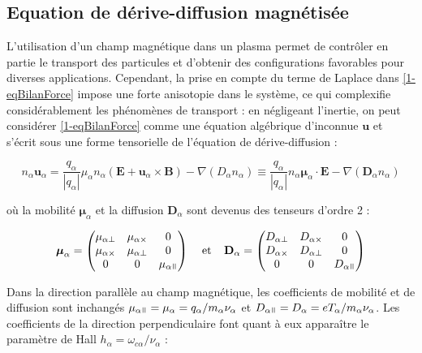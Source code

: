 \begin{refsection}
\subsection{Equation de dérive-diffusion magnétisée}
L'utilisation d'un champ magnétique dans un plasma permet de contrôler en partie
le transport des particules et d'obtenir des configurations favorables pour
diverses applications. Cependant, la prise en compte du terme de Laplace dans
\eqref{1-eqBilanForce} impose une forte anisotopie dans le système, ce qui
complexifie considérablement les phénomènes de transport : en
négligeant l'inertie, on peut considérer \eqref{1-eqBilanForce} comme une
équation algébrique d'inconnue $\mathbf u$ et s'écrit sous une forme
tensorielle de l'équation de dérive-diffusion :

\begin{equation}
\label{1-eqDriftDif}
n_\alpha\mathbf u_\alpha=\frac{q_\alpha}{|q_\alpha|}\mu_\alpha
n_\alpha\left(\mathbf E+\mathbf u_\alpha\times\mathbf
B\right)-\nabla\left(D_\alpha n_\alpha\right)\equiv
\frac{q_\alpha}{|q_\alpha|} n_\alpha\boldsymbol{\mu}_\alpha\cdot \mathbf
E-{\nabla\left(\mathbf{D}_\alpha n_\alpha\right)}
\end{equation}

où la mobilité $\boldsymbol{\mu}_\alpha$ et la diffusion $\mathbf{D}_\alpha$
sont devenus des tenseurs d'ordre 2 :

\begin{align}
\boldsymbol{\mu}_\alpha =
 \begin{pmatrix}
  \mu_{\alpha\perp} & \mu_{\alpha\times} & 0 \\
  \mu_{\alpha\times} & \mu_{\alpha\perp} & 0 \\
  0  & 0  & \mu_{\alpha\para} 
 \end{pmatrix}\;\;\;\;\text{et}\;\;\;\;
 \mathbf D_\alpha =
 \begin{pmatrix}
  D_{\alpha\perp} & D_{\alpha\times} & 0 \\
  D_{\alpha\times} & D_{\alpha\perp} & 0 \\
  0  & 0  & D_{\alpha\para} 
 \end{pmatrix}
\end{align}

Dans la direction parallèle au champ magnétique, les coefficients de mobilité et
de diffusion sont inchangés
$\mu_{\alpha\para}=\mu_{\alpha}=q_\alpha/m_\alpha\nu_\alpha$ et
$D_{\alpha\para}=D_\alpha=eT_\alpha/m_\alpha\nu_\alpha$. Les coefficients de la
direction perpendiculaire font quant à eux apparaître le paramètre de Hall
$h_\alpha=\omega_{c\alpha}/\nu_\alpha$ :


\end{refsection}
